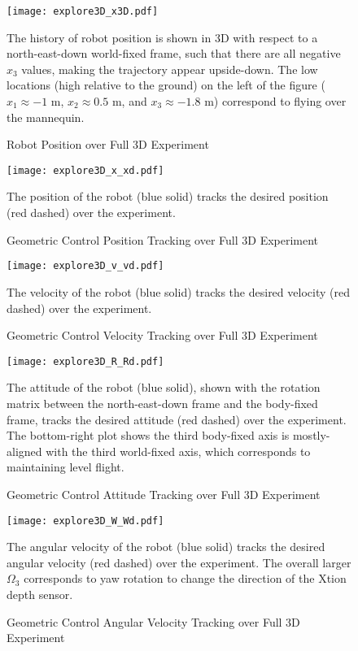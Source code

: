 \begin{figure}
	\centering
	\texttt{[image: explore3D\_x3D.pdf]}
	\caption{Robot Position over Full 3D Experiment}
	\medskip
	\small
	The history of robot position is shown in 3D with respect to a north-east-down world-fixed frame, such that there are all negative $x_3$ values, making the trajectory appear upside-down. The low locations (high relative to the ground) on the left of the figure ($x_1\approx-1$ m, $x_2\approx0.5$ m, and $x_3\approx-1.8$ m) correspond to flying over the mannequin.
	\label{fig:Explore3D_x3D}
\end{figure}


\begin{figure}
	\centering
	\texttt{[image: explore3D\_x\_xd.pdf]}
	\caption{Geometric Control Position Tracking over Full 3D Experiment}
	\medskip
	\small
	The position of the robot (blue solid) tracks the desired position (red dashed) over the experiment.
	\label{fig:Explore3D_x_xd}
\end{figure}

\begin{figure}
	\centering
	\texttt{[image: explore3D\_v\_vd.pdf]}
	\caption{Geometric Control Velocity Tracking over Full 3D Experiment}
	\medskip
	\small
	The velocity of the robot (blue solid) tracks the desired velocity (red dashed) over the experiment.
	\label{fig:Explore3D_v_vd}
\end{figure}

\begin{figure}
	\centering
	\texttt{[image: explore3D\_R\_Rd.pdf]}
	\caption{Geometric Control Attitude Tracking over Full 3D Experiment}
	\medskip
	\small
	The attitude of the robot (blue solid), shown with the rotation matrix between the north-east-down frame and the body-fixed frame, tracks the desired attitude (red dashed) over the experiment. The bottom-right plot shows the third body-fixed axis is mostly-aligned with the third world-fixed axis, which corresponds to maintaining level flight.
	\label{fig:Explore3D_R_Rd}
\end{figure}

\begin{figure}
	\centering
	\texttt{[image: explore3D\_W\_Wd.pdf]}
	\caption{Geometric Control Angular Velocity Tracking over Full 3D Experiment}
	\medskip
	\small
	The angular velocity of the robot (blue solid) tracks the desired angular velocity (red dashed) over the experiment. The overall larger $\Omega_3$ corresponds to yaw rotation to change the direction of the Xtion depth sensor.
	\label{fig:Explore3D_W_Wd}
\end{figure}


